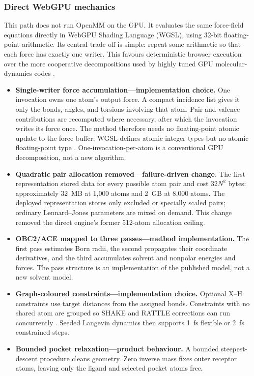 \subsubsection{Direct WebGPU mechanics}

This path does not run OpenMM on the GPU. It evaluates the same force-field
equations directly in WebGPU Shading Language (WGSL), using 32-bit floating-point
arithmetic. Its central trade-off is simple: repeat some arithmetic so that each
force has exactly one writer. This favours deterministic browser execution over
the more cooperative decompositions used by highly tuned GPU molecular-dynamics
codes \cite{glaser2015strong}.

\begin{itemize}
  \item \textbf{Single-writer force accumulation---implementation choice.}
    One invocation owns one atom's output force. A compact incidence list gives
    it only the bonds, angles, and torsions involving that atom. Pair and valence
    contributions are recomputed where necessary, after which the invocation
    writes its force once. The method therefore needs no floating-point atomic
    update to the force buffer; WGSL defines atomic integer types but no atomic
    floating-point type \cite{w3c2026wgsl}. One-invocation-per-atom is a
    conventional GPU decomposition, not a new algorithm.
  \item \textbf{Quadratic pair allocation removed---failure-driven change.}
    The first representation stored data for every possible atom pair and cost
    $32N^2$ bytes: approximately 32~MB at 1,000 atoms and 2~GB at 8,000 atoms.
    The deployed representation stores only excluded or specially scaled pairs;
    ordinary Lennard--Jones parameters are mixed on demand. This change removed
    the direct engine's former 512-atom allocation ceiling.
  \item \textbf{OBC2/ACE mapped to three passes---method implementation.}
    The first pass estimates Born radii, the second propagates their coordinate
    derivatives, and the third accumulates solvent and nonpolar energies and
    forces. The pass structure is an implementation of the published model, not
    a new solvent model.
  \item \textbf{Graph-coloured constraints---implementation choice.}
    Optional X--H constraints use target distances from the assigned bonds.
    Constraints with no shared atom are grouped so SHAKE and RATTLE corrections
    can run concurrently \cite{ryckaert1977shake,andersen1983rattle}. Seeded
    Langevin dynamics then supports 1~fs flexible or 2~fs constrained steps.
  \item \textbf{Bounded pocket relaxation---product behaviour.} A bounded
    steepest-descent procedure cleans geometry. Zero inverse mass fixes outer
    receptor atoms, leaving only the ligand and selected pocket atoms free.
\end{itemize}

